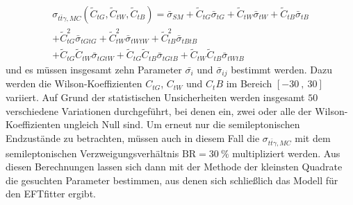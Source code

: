 \begin{align}
  \sigma_{t\bar{t}\gamma, MC}({\tilde{C}_{tG}, \tilde{C}_{tW}, \tilde{C}_{tB}}) = \bar{\sigma}_{SM} + \tilde{C}_{tG}\bar{\sigma}_{tG} + \tilde{C}_{tW}\bar{\sigma}_{tW} + \tilde{C}_{tB}\bar{\sigma}_{tB}\\ \nonumber
  + \tilde{C}_{tG}^2\bar{\sigma}_{tGtG} + \tilde{C}_{tW}^2\bar{\sigma}_{tWtW} + \tilde{C}_{tB}^2\bar{\sigma}_{tBtB}\\
  + \tilde{C}_{tG} \tilde{C}_{tW}\bar{\sigma}_{tGtW} + \tilde{C}_{tG} \tilde{C}_{tB}\bar{\sigma}_{tGtB} + \tilde{C}_{tW} \tilde{C}_{tB}\bar{\sigma}_{tWtB} \nonumber
\end{align}
und es müssen insgesamt zehn Parameter $\bar{\sigma_i}$ und $\bar{\sigma}_{ij}$ bestimmt werden. Dazu werden die Wilson-Koeffizienten $C_{tG}$, $C_{tW}$ und $C_tB$ im Bereich $[-30~,~30]$ variiert. Auf Grund der statistischen Unsicherheiten werden insgesamt $50$ verschiedene Variationen durchgeführt, bei denen ein, zwei oder alle der Wilson-Koeffizienten ungleich Null sind.
Um erneut nur die semileptonischen Endzustände zu betrachten, müssen auch in diesem Fall die $\sigma_{t\bar{t}\gamma, MC}$ mit dem semileptonischen Verzweigungsverhältnis $\mathrm{BR} = \SI{30}{\percent}$ multipliziert werden.
Aus diesen Berechnungen lassen sich dann mit der Methode der kleinsten Quadrate die gesuchten Parameter bestimmen, aus denen sich schließlich das Modell für den EFTfitter ergibt.


